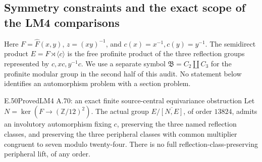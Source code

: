 \subsection{Symmetry constraints and the exact scope of the LM4 comparisons}

Here \(F=\widehat F(x,y)\), \(z=(xy)^{-1}\), and
\(c(x)=x^{-1},c(y)=y^{-1}\). The semidirect product
\(E=F\rtimes\langle c\rangle\) is the free profinite product
of the three reflection groups represented by \(c,xc,y^{-1}c\).
We use a separate symbol \(\mathfrak B=C_2\amalg C_3\) for the
profinite modular group in the second half of this audit. No statement
below identifies an automorphism problem with a section problem.

\begin{result}{E.50}{Proved}{LM4 A.70: an exact finite source-central equivariance obstruction}
Let \(N=\ker(F\to(\mathbb Z/12)^2)\). The actual group
\(E/\overline{[N,E]}\), of order \(13824\), admits an involutory
automorphism fixing \(c\), preserving the three named reflection
classes, and preserving the three peripheral classes with common
multiplier congruent to seven modulo twenty-four. There is no full
reflection-class-preserving peripheral lift, of any order.
\end{result}
